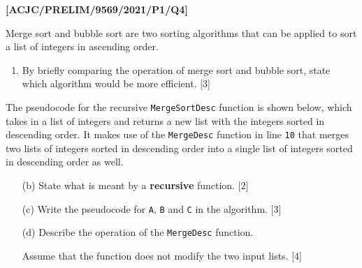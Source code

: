 \item \textbf{{[}ACJC/PRELIM/9569/2021/P1/Q4{]} }

Merge sort and bubble sort are two sorting algorithms that can be
applied to sort a list of integers in ascending order.
\begin{enumerate}
\item By briefly comparing the operation of merge sort and bubble sort,
state which algorithm would be more efficient. \hfill{}{[}3{]}
\end{enumerate}
The pseudocode for the recursive \texttt{MergeSortDesc} function is
shown below, which takes in a list of integers and returns a new list
with the integers sorted in descending order. It makes use of the
\texttt{MergeDesc} function in line \texttt{10} that merges two lists
of integers sorted in descending order into a single list of integers
sorted in descending order as well.

\begin{enumerate}
\item[(b)] State what is meant by a \textbf{recursive} function. \hfill{}{[}2{]}
\item[(c)] Write the pseudocode for \texttt{A}, \texttt{B} and \texttt{C} in
the algorithm. \hfill{}{[}3{]}
\item[(d)] Describe the operation of the \texttt{MergeDesc} function.

Assume that the function does not modify the two input lists.\hfill{}
{[}4{]}
\end{enumerate}